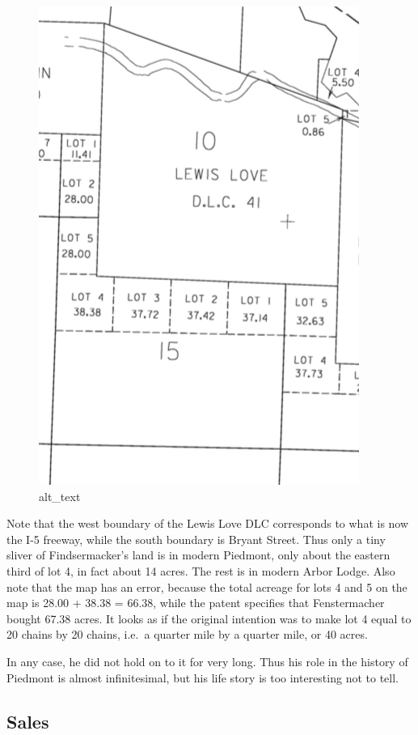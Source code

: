 \documentclass[
  12pt,
]{book}
\begin{document}
\begin{figure}
\centering
\includegraphics{images/0204a_images/image3.png}
\caption{alt\_text}
\end{figure}

Note that the west boundary of the Lewis Love DLC corresponds to what is now the I-5 freeway, while the south boundary is Bryant Street. Thus only a tiny sliver of Findsermacker's land is in modern Piedmont, only about the eastern third of lot 4, in fact about 14 acres. The rest is in modern Arbor Lodge. Also note that the map has an error, because the total acreage for lots 4 and 5 on the map is 28.00 + 38.38 = 66.38, while the patent specifies that Fenstermacher bought 67.38 acres. It looks as if the original intention was to make lot 4 equal to 20 chains by 20 chains, i.e.~a quarter mile by a quarter mile, or 40 acres.

In any case, he did not hold on to it for very long. Thus his role in the history of Piedmont is almost infinitesimal, but his life story is too interesting not to tell.

\hypertarget{sales-2}{%
\subsection{Sales}\label{sales-2}}
\end{document}
